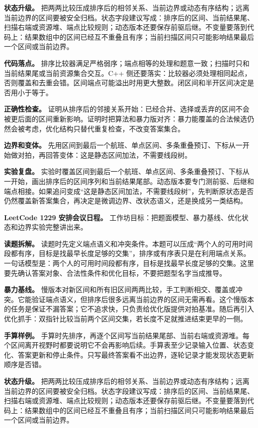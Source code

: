 \textbf{状态升级。} 把两两比较压成排序后的相邻关系、当前边界或动态有序结构；远离当前边界的区间要被安全归档。状态字段建议写成：排序后的区间、当前结果尾、扫描右端或资源堆、端点比较规则；动态版本还要保存前驱后继。不变量要落到代码上：结果数组中的区间已经互不重叠且有序；当前扫描区间只可能影响结果最后一个区间或当前边界。

\textbf{代码落点。} 排序比较器满足严格弱序；端点相等的处理和题意一致；扫描时只和当前结果尾或当前资源集合交互。C++ 侧还要落实：比较器必须处理相同起点，否则覆盖和去重会错。区间端点可能溢出时用更大整数。闭区间和半开区间决定是否用小于等于。

\textbf{正确性检查。} 证明从排序后的邻接关系开始：已经合并、选择或丢弃的区间不会被更后面的区间重新影响。证明时把算法和暴力版对齐：暴力能覆盖的合法候选仍然会被考虑，优化结构只替代重复检查，不改变答案集合。

\textbf{边界和变体。} 先用区间到最后一个航班、单点区间、多条重叠预订、下标从一开始做对拍，再回答变体：这是静态区间加法，不需要线段树。

\textbf{实验复盘。} 实验时覆盖区间到最后一个航班、单点区间、多条重叠预订、下标从一开始，画出排序后的区间序列和当前结果尾部。动态版本要专门测前驱、后继和端点相接。如果追问变成“这是静态区间加法，不需要线段树”，先判断原状态是否仍然覆盖新答案集合，再决定是微调边界、改状态语义，还是换成另一类结构。

\noindent\textbf{LeetCode 1229 安排会议日程。} 工作坊目标：把题面模型、暴力基线、优化状态和边界实验完整讲出来。

\textbf{读题拆解。} 读题时先定义端点语义和冲突条件。本题可以压成“两个人的可用时间段都有序，目标是找最早长度足够的交集”，排序或有序表只是在利用端点关系。一句话模型是：两个人的可用时间段都有序，目标是找最早长度足够的交集。这里要先确认答案对象、合法性条件和优化目标，不要把题型名字当成推导。

\textbf{暴力基线。} 慢版本对新区间和所有旧区间两两比较，手工判断相交、覆盖或冲突。它能验证端点语义，但排序后很多远离当前边界的区间无需再看。这个慢版本的任务是保证不漏答案；它不追求快，只负责给优化版提供对拍基准。随后再引入优化抓手：双指针比较当前两个区间交集，若长度不足就推进结束更早的一侧。

\textbf{手算样例。} 手算时先排序，再逐个区间写当前结果尾部、当前右端或资源堆。每个区间离开视野时都要说明它不会再影响后续。手算表至少记录输入位置、状态变化、答案更新和停止条件。只写最终答案看不出边界，逐轮记录才能发现状态更新顺序是否错。

\textbf{状态升级。} 把两两比较压成排序后的相邻关系、当前边界或动态有序结构；远离当前边界的区间要被安全归档。状态字段建议写成：排序后的区间、当前结果尾、扫描右端或资源堆、端点比较规则；动态版本还要保存前驱后继。不变量要落到代码上：结果数组中的区间已经互不重叠且有序；当前扫描区间只可能影响结果最后一个区间或当前边界。

